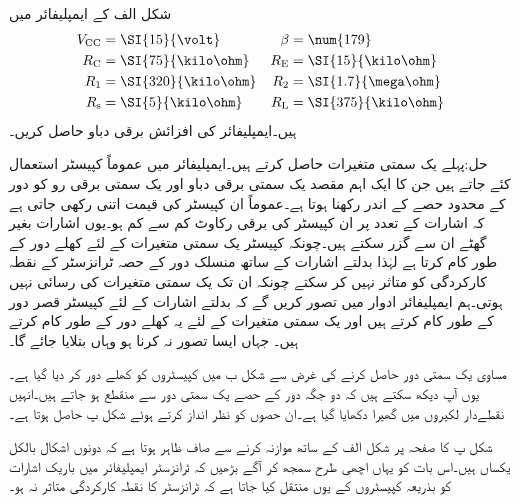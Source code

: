  
شکل  الف کے ایمپلیفائر میں
\begin{align*}
V_{\textup{CC}} &=\SI{15}{\volt} & \beta&=\num{179}\\
R_{\textup{C}} &=\SI{75}{\kilo \ohm} &  R_{\textup{E}} &=\SI{15}{\kilo \ohm}\\
R_{\textup{1}} &=\SI{320}{\kilo \ohm} & R_{\textup{2}} &=\SI{1.7}{\mega \ohm}\\
R_{\textup{s}} &=\SI{5}{\kilo \ohm} & R_{\textup{L}} &=\SI{375}{\kilo \ohm}
\end{align*}
ہیں۔ایمپلیفائر کی افزائش برقی دباو   حاصل کریں۔

حل:پہلے یک سمتی متغیرات حاصل کرتے ہیں۔ایمپلیفائر میں عموماً کپیسٹر استعمال کئے جاتے ہیں جن کا ایک اہم مقصد یک سمتی برقی دباو اور یک سمتی برقی رو کو دور کے محدود حصے کے اندر رکھنا ہوتا ہے۔عموماً ان کپیسٹر کی قیمت اتنی رکھی جاتی ہے کہ اشارات کے تعدد پر ان کپیسٹر کی برقی رکاوٹ کم سے کم ہو۔یوں اشارات بغیر گھٹے ان سے گزر سکتے ہیں۔چونکہ کپیسٹر یک سمتی متغیرات کے لئے کھلے دور کے طور کام کرتا ہے لہٰذا بدلتے اشارات کے ساتھ منسلک دور کے حصہ ٹرانزسٹر کے نقطہ کارکردگی کو متاثر نہیں کر سکتے چونکہ ان تک یک سمتی متغیرات کی رسائی نہیں ہوتی۔ہم ایمپلیفائر ادوار میں تصور کریں گے کہ بدلتے اشارات کے لئے کپیسٹر قصر دور کے طور کام کرتے ہیں اور یک سمتی متغیرات کے لئے یہ کھلے دور کے طور کام کرتے ہیں۔ جہاں ایسا تصور نہ کرنا ہو وہاں بتلایا جائے گا۔

مساوی یک سمتی دور حاصل کرنے کی غرض سے شکل  ب میں کپیسٹروں کو کھلے دور کر دیا گیا ہے۔یوں آپ دیکھ سکتے ہیں کہ دو جگہ دور کے حصے یک سمتی دور سے منقطع ہو جاتے ہیں۔انہیں نقطےدار لکیروں میں گھیرا دکھایا گیا ہے۔ان حصوں کو نظر انداز کرتے ہوئے شکل  پ حاصل ہوتا ہے۔

شکل  پ کا صفحہ \pageref{شکل_ایک_عدد_پیداکار_برقی_دباو_سے_مائل}  پر شکل  الف کے ساتھ موازنہ کرنے سے صاف ظاہر ہوتا ہے کہ دونوں اشکال بالکل یکساں ہیں۔اس بات کو یہاں اچھی طرح سمجھ کر آگے بڑھیں کہ ٹرانزسٹر ایمپلیفائر میں باریک اشارات کو بذریعہ کپیسٹروں کے یوں منتقل کیا جاتا ہے کہ ٹرانزسٹر کا نقطہ کارکردگی متاثر نہ ہو۔

